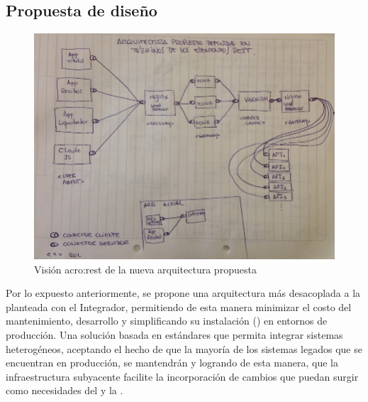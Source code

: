 \subsection{Propuesta de diseño}
\label{propuesta}


\begin{figure}
  \includegraphics[width=\linewidth]{src/images/04-capitulo-4/nueva-arq-segun-rest.jpg}
  \caption{Visión \gls{acro:rest} de la nueva arquitectura propuesta}
  \label{fig:ejemplo-rest-nueva-arquitectura}
\end{figure}




Por lo expuesto anteriormente, se propone una arquitectura más desacoplada a la planteada con el Integrador, permitiendo de esta manera minimizar el costo del mantenimiento, desarrollo y simplificando su instalación () en entornos de producción. Una solución basada en estándares que permita integrar sistemas heterogéneos, aceptando el hecho de que la mayoría de los sistemas legados que se encuentran en producción, se mantendrán y logrando de esta manera, que la infraestructura subyacente facilite la incorporación de cambios que puedan surgir como necesidades del \cespi y la \unlp.

